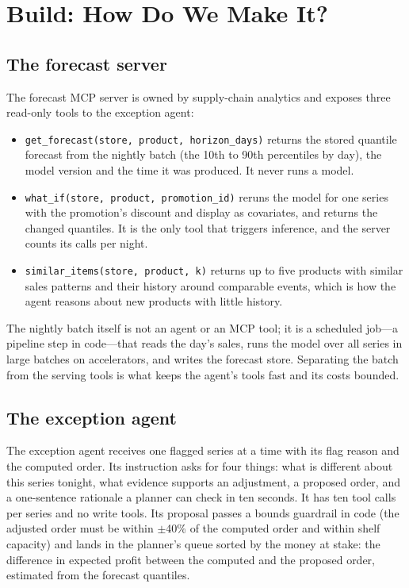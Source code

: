 
\section{Build: How Do We Make It?}
\label{sec:fc-build}

\subsection{The forecast server}

The forecast MCP server is owned by supply-chain analytics and exposes three read-only tools to the exception agent:
\begin{itemize}[itemsep=1pt]
  \item \texttt{get\_forecast(store, product, horizon\_days)} returns the stored quantile forecast from the nightly batch (the 10th to 90th percentiles by day), the model version and the time it was produced. It never runs a model.
  \item \texttt{what\_if(store, product, promotion\_id)} reruns the model for one series with the promotion's discount and display as covariates, and returns the changed quantiles. It is the only tool that triggers inference, and the server counts its calls per night.
  \item \texttt{similar\_items(store, product, k)} returns up to five products with similar sales patterns and their history around comparable events, which is how the agent reasons about new products with little history.
\end{itemize}
The nightly batch itself is not an agent or an MCP tool; it is a scheduled job---a pipeline step in code---that reads the day's sales, runs the model over all series in large batches on accelerators, and writes the forecast store. Separating the batch from the serving tools is what keeps the agent's tools fast and its costs bounded.

\subsection{The exception agent}

The exception agent receives one flagged series at a time with its flag reason and the computed order. Its instruction asks for four things: what is different about this series tonight, what evidence supports an adjustment, a proposed order, and a one-sentence rationale a planner can check in ten seconds. It has ten tool calls per series and no write tools. Its proposal passes a bounds guardrail in code (the adjusted order must be within $\pm$40\% of the computed order and within shelf capacity) and lands in the planner's queue sorted by the money at stake: the difference in expected profit between the computed and the proposed order, estimated from the forecast quantiles.

